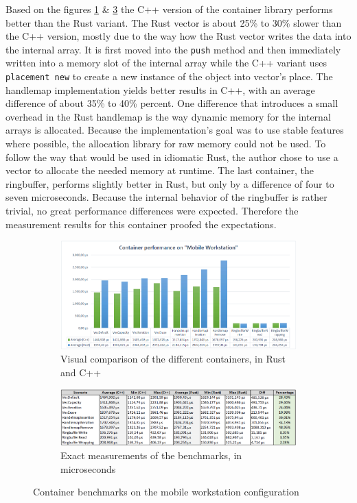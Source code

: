 Based on the figures \ref{fig:cont_bench_work} \& \ref{fig:cont_bench_blade} the C++ version of the container library performs better than the Rust variant. The Rust vector is about 25\% to 30\% slower than the C++ version, mostly due to the way how the Rust vector writes the data into the internal array. It is first moved into the \texttt{push} method and then immediately written into a memory slot of the internal array while the C++ variant uses \texttt{placement new} to create a new instance of the object into vector's place. 
The handlemap implementation yields better results in C++, with an average difference of about 35\% to 40\% percent. One difference that introduces a small overhead in the Rust handlemap is the way dynamic memory for the internal arrays is allocated. Because the implementation's goal was to use stable features where possible, the allocation library for raw memory could not be used. To follow the way that would be used in idiomatic Rust, the author chose to use a vector to allocate the needed memory at runtime. 
The last container, the ringbuffer, performs slightly better in Rust, but only by a difference of four to seven microseconds. Because the internal behavior of the ringbuffer is rather trivial, no great performance differences were expected. Therefore the measurement results for this container proofed the expectations. 

\begin{figure}[h!]
	\centering
	\begin{subfigure}[b]{\textwidth}
		\includegraphics[width=1\linewidth]{PICs/container_bench_workstation.png}
		\caption{Visual comparison of the different containers, in Rust and C++}
		\label{fig:cont_bench_work} 
	\end{subfigure}
	
	\begin{subfigure}[b]{\textwidth}
		\includegraphics[width=1\linewidth]{PICs/container_bench_workstation_data.png}
		\caption{Exact measurements of the benchmarks, in microseconds}
		\label{fig:cont_bench_blade}
	\end{subfigure}
	
	\caption[Container benchmarks workstation]{Container benchmarks on the mobile workstation configuration}
\end{figure}

